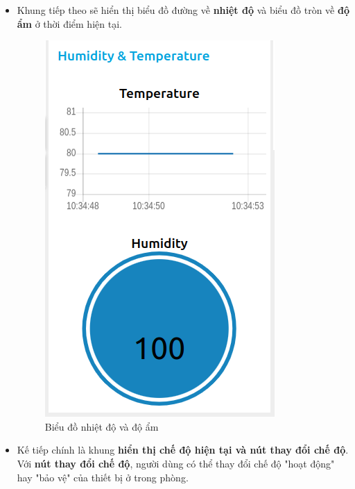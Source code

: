 \documentclass{report}
\begin{document}
\begin{itemize}
\begin{itemize}
        \item Khung tiếp theo sẽ hiển thị biểu đồ đường về \textbf{nhiệt độ} và biểu đồ tròn về \textbf{độ ẩm} ở thời điểm hiện tại.
        \begin{figure}[H]
            \includegraphics[width=\textwidth, height=0.4\textheight, keepaspectratio]{img/temp_humid.png}
            \centering
            \caption{Biểu đồ nhiệt độ và độ ẩm}
        \end{figure}

        \item Kế tiếp chính là khung \textbf{hiển thị chế độ hiện tại và nút thay đổi chế độ}. Với \textbf{nút thay đổi chế độ}, người dùng có thể thay đổi chế độ "hoạt động" hay "bảo vệ" của thiết bị ở trong phòng.


\end{itemize}
\end{itemize}
\end{document}
